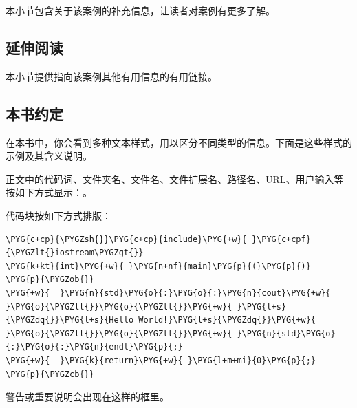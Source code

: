 
本小节包含关于该案例的补充信息，让读者对案例有更多了解。



\subsection*{延伸阅读}



本小节提供指向该案例其他有用信息的有用链接。



\subsection*{本书约定}



在本书中，你会看到多种文本样式，用以区分不同类型的信息。下面是这些样式的示例及其含义说明。



正文中的代码词、文件夹名、文件名、文件扩展名、路径名、URL、用户输入等按如下方式显示：。



代码块按如下方式排版：



\begin{codeblockbg}
\begin{Verbatim}[commandchars=\\\{\},breaklines=true,breakanywhere=true,fontsize=\codefont,xleftmargin=17bp]
\PYG{c+cp}{\PYGZsh{}}\PYG{c+cp}{include}\PYG{+w}{ }\PYG{c+cpf}{\PYGZlt{}iostream\PYGZgt{}}
\PYG{k+kt}{int}\PYG{+w}{ }\PYG{n+nf}{main}\PYG{p}{(}\PYG{p}{)}
\PYG{p}{\PYGZob{}}
\PYG{+w}{  }\PYG{n}{std}\PYG{o}{:}\PYG{o}{:}\PYG{n}{cout}\PYG{+w}{ }\PYG{o}{\PYGZlt{}}\PYG{o}{\PYGZlt{}}\PYG{+w}{ }\PYG{l+s}{\PYGZdq{}}\PYG{l+s}{Hello World!}\PYG{l+s}{\PYGZdq{}}\PYG{+w}{ }\PYG{o}{\PYGZlt{}}\PYG{o}{\PYGZlt{}}\PYG{+w}{ }\PYG{n}{std}\PYG{o}{:}\PYG{o}{:}\PYG{n}{endl}\PYG{p}{;}
\PYG{+w}{  }\PYG{k}{return}\PYG{+w}{ }\PYG{l+m+mi}{0}\PYG{p}{;}
\PYG{p}{\PYGZcb{}}
\end{Verbatim}
\end{codeblockbg}



\begin{myNote}
警告或重要说明会出现在这样的框里。
\end{myNote}


